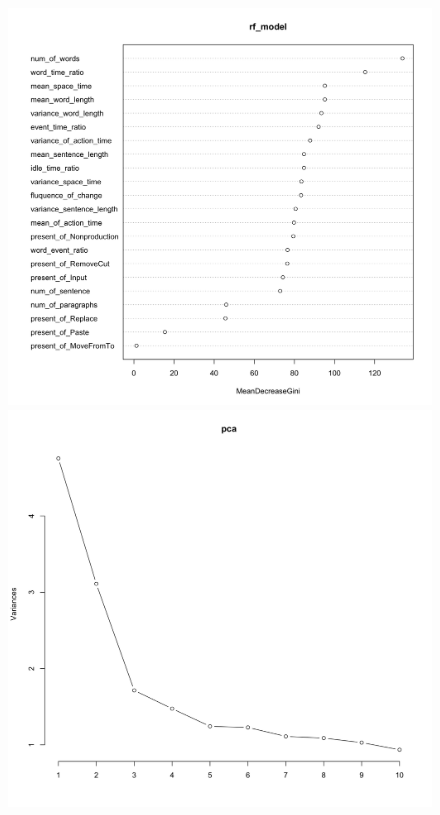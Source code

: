 \documentclass[8pt]{report}
\begin{document}
\begin{figure}[H]
    \centering
    \includegraphics*[scale=0.07]{figures/Variable_improtance_RF.png}
    \includegraphics*[scale=0.07]{figures/PCA.png}

\end{figure}
\end{document}
